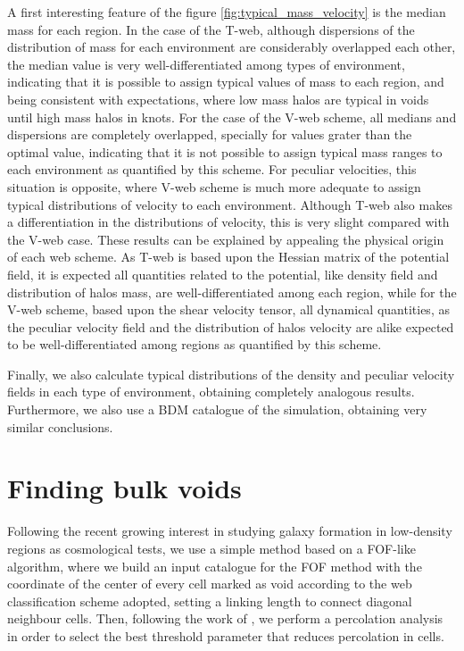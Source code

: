 \documentclass[a4,useAMS,usenatbib,usegraphicx]{latex/mn2e}
\begin{document}
A first interesting feature of the figure  \ref{fig:typical_mass_velocity} 
is the median mass for each region. In the case of the T-web, although 
dispersions of the distribution of mass for each environment are 
considerably overlapped each other, the median value is very 
well-differentiated among types of environment, indicating that it is 
possible to assign typical values of mass to each region, and being 
consistent with expectations, where low mass halos are typical in voids 
until high mass halos in knots. For the case of the V-web scheme, all
medians and dispersions are completely overlapped, specially for values 
grater than the optimal \lth value, indicating that it is not possible to
assign typical mass ranges to each environment as quantified by this 
scheme. For peculiar velocities, this situation is opposite, where V-web
scheme is much more adequate to assign typical distributions of velocity
to each environment. Although T-web also makes a differentiation in the 
distributions of velocity, this is very slight compared with the V-web 
case. These results can be explained by appealing the physical origin of 
each web scheme. As T-web is based upon the Hessian matrix of the 
potential field, it is expected all quantities related to the potential, 
like density field and distribution of halos mass, are well-differentiated 
among each region, while for the V-web scheme, based upon the shear 
velocity tensor, all dynamical quantities, as the peculiar velocity field 
and the distribution of halos velocity are alike expected to be 
well-differentiated among regions as quantified by this scheme.



Finally, we also calculate typical distributions of the density and 
peculiar velocity fields in each type of environment, obtaining completely
analogous results. Furthermore, we also use a BDM catalogue of the 
simulation, obtaining very similar conclusions.



\section{Finding bulk voids}
\label{sec:bulk_voids}


Following the recent growing interest in studying galaxy formation in 
low-density regions as cosmological tests, we use a simple method based on 
a FOF-like algorithm, where we build an input catalogue for the FOF method
with the coordinate of the center of every cell marked as void according 
to the web classification scheme adopted, setting a linking length to 
connect diagonal neighbour cells. Then, following the work of 
, we perform a percolation analysis in 
order to select the best threshold parameter that reduces percolation in 
cells. 
\end{document}
